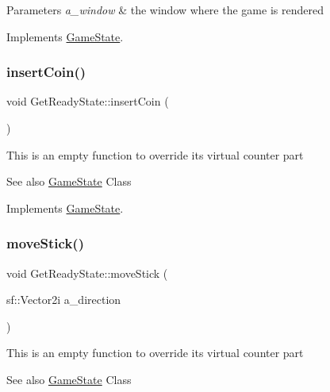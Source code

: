\begin{DoxyParams}{Parameters}
{\em a\+\_\+window} & the window where the game is rendered \\
\hline
\end{DoxyParams}


Implements \hyperlink{class_game_state_a5ffd5ce9acb7499ddef613e8836d1ef8}{Game\+State}.

\mbox{\label{class_get_ready_state_afac1da927d38cf32960f2370856ec9f6}} 
\subsubsection{\texorpdfstring{insert\+Coin()}{insertCoin()}}
{\footnotesize\ttfamily void Get\+Ready\+State\+::insert\+Coin (\begin{DoxyParamCaption}{ }\end{DoxyParamCaption})\hspace{0.3cm}{\ttfamily [virtual]}}

This is an empty function to override it\textquotesingle{}s virtual counter part \begin{DoxySeeAlso}{See also}
\hyperlink{class_game_state}{Game\+State} Class 
\end{DoxySeeAlso}


Implements \hyperlink{class_game_state_a4cd6f5b4ad23fc08dca287df26d94b94}{Game\+State}.

\mbox{\label{class_get_ready_state_a0a7f1548b4c58e8bd5634ceb59ba7b9b}} 
\subsubsection{\texorpdfstring{move\+Stick()}{moveStick()}}
{\footnotesize\ttfamily void Get\+Ready\+State\+::move\+Stick (\begin{DoxyParamCaption}\item[{sf\+::\+Vector2i}]{a\+\_\+direction }\end{DoxyParamCaption})\hspace{0.3cm}{\ttfamily [virtual]}}

This is an empty function to override it\textquotesingle{}s virtual counter part \begin{DoxySeeAlso}{See also}
\hyperlink{class_game_state}{Game\+State} Class 
\end{DoxySeeAlso}

